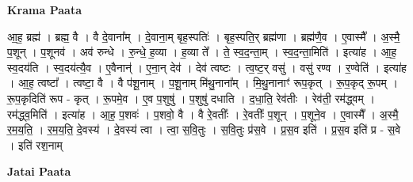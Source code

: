 \documentclass[17pt]{extarticle}
\begin{document}
\textbf{Krama Paata} \newline

आ॒ह॒ ब्रह्म॑ । ब्रह्म॒ वै । वै दे॒वाना᳚म् । दे॒वाना॒म् बृह॒स्पतिः॑ । बृह॒स्पति॒र् ब्रह्म॑णा । ब्रह्म॑णै॒व । ए॒वास्मै᳚ । अ॒स्मै॒ प॒शून् । प॒शूनव॑ । अव॑ रुन्धे । रु॒न्धे॒ ह॒व्या । ह॒व्या ते᳚ । ते॒ स्व॒द॒न्ता॒म् । स्व॒द॒न्ता॒मिति॑ । इत्या॑ह । आ॒ह॒ स्व॒दय॑ति । स्व॒दय॑त्यै॒व । ए॒वैनान्॑ । ए॒ना॒न् देव॑ । देव॑ त्वष्टः । त्व॒ष्ट॒र् वसु॑ । वसु॑ रण्व । र॒ण्वेति॑ । इत्या॑ह । आ॒ह॒ त्वष्टा᳚ । त्वष्टा॒ वै । वै प॑शू॒नाम् । प॒शू॒नाम् मि॑थु॒नाना᳚म् । मि॒थु॒नानाꣳ॑ रूप॒कृत् । रू॒प॒कृद् रू॒पम् । रू॒प॒कृदिति॑ रूप - कृत् । रू॒पमे॒व । ए॒व प॒शुषु॑ । प॒शुषु॑ दधाति । द॒धा॒ति॒ रेव॑तीः । रेव॑ती॒ रम॑द्ध्वम् । रम॑द्ध्व॒मिति॑ । इत्या॑ह । आ॒ह॒ प॒शवः॑ । प॒शवो॒ वै । वै रे॒वतीः᳚ । रे॒वतीः᳚ प॒शून् । प॒शूने॒व । ए॒वास्मै᳚ । अ॒स्मै॒ र॒म॒य॒ति॒ । र॒म॒य॒ति॒ दे॒वस्य॑ । दे॒वस्य॑ त्वा । त्वा॒ स॒वि॒तुः । स॒वि॒तुः प्र॑स॒वे । प्र॒स॒व इति॑ । प्र॒स॒व इति॑ प्र - स॒वे । इति॑ रश॒नाम् \newline

\textbf{Jatai Paata} \newline
\end{document}
